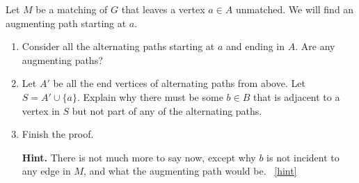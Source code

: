 \documentclass{book}
\begin{document}
\setcounter{project}{60}
\addtocounter{project}{-1}
\begin{activity}[]\label{activity-53}
\hypertarget{p-468}{}%
Let \(M\) be a matching of \(G\) that leaves a vertex \(a \in A\) unmatched.  We will find an augmenting path starting at \(a\).%
\begin{enumerate}[font=\bfseries,label=(\alph*),ref=\alph*]
\item\label{task-65} \hypertarget{p-469}{}%
Consider all the alternating paths starting at \(a\) and ending in \(A\).  Are any augmenting paths?%
\item\label{task-66} \hypertarget{p-470}{}%
Let \(A'\) be all the end vertices of alternating paths from above.  Let \(S = A' \cup \{a\}\).  Explain why there must be some \(b \in B\) that is adjacent to a vertex in \(S\) but not part of any of the alternating paths.%
\item\label{task-67} \hypertarget{p-471}{}%
Finish the proof.%
\par\smallskip%
\noindent\textbf{Hint.}\hypertarget{hint-24}{}\quad%
\hypertarget{p-472}{}%
There is not much more to say now, except why \(b\) is not incident to any edge in \(M\), and what the augmenting path would be.%
~\hfill{\tiny\hyperlink{a-60.c}{[hint]}\hypertarget{q-60.c}{}}\end{enumerate}
\end{activity}

\clearpage
\end{document}
